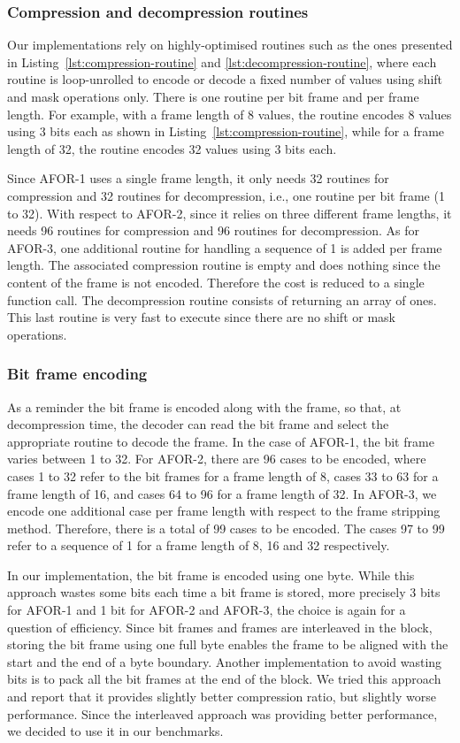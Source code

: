\subsubsection{Compression and decompression routines}

Our implementations rely on highly-optimised routines such as the ones
presented in Listing~\ref{lst:compression-routine} and
\ref{lst:decompression-routine}, where each routine is loop-unrolled to encode
or decode a fixed number of values using shift and mask operations only. There
is one routine per bit frame and per frame length. For example, with a frame
length of 8 values, the routine encodes 8 values using 3 bits each as shown in
Listing~\ref{lst:compression-routine}, while for a frame length of 32, the
routine encodes 32 values using 3 bits each.

Since AFOR-1 uses a single frame length, it only needs 32 routines for
compression and 32 routines for decompression, i.e., one routine per bit frame
(1 to 32). With respect to AFOR-2, since it relies on three different frame
lengths, it needs 96 routines for compression and 96 routines for
decompression. As for AFOR-3, one additional routine for handling a
sequence of 1 is added per frame length. The associated compression routine is
empty and does nothing since the content of the frame is not encoded.
Therefore the cost is reduced to a single function call. The decompression
routine consists of returning an array of ones. This last routine is very fast
to execute since there are no shift or mask operations.

\subsubsection{Bit frame encoding}

As a reminder the bit frame is encoded along with the frame, so that, at
decompression time, the decoder can read the bit frame and select the
appropriate routine to decode the frame. In the case of AFOR-1, the bit frame
varies between 1 to 32. For AFOR-2, there are 96 cases to be encoded, where
cases 1 to 32 refer to the bit frames for a frame length of 8, cases 33 to 63
for a frame length of 16, and cases 64 to 96 for a frame length of 32. In
AFOR-3, we encode one additional case per frame length with respect to the
frame stripping method. Therefore, there is a total of 99 cases to be encoded.
The cases 97 to 99 refer to a sequence of 1 for a frame length of 8, 16 and 32
respectively.

In our implementation, the bit frame is encoded using one byte. While this
approach wastes some bits each time a bit frame is stored, more precisely 3
bits for AFOR-1 and 1 bit for AFOR-2 and AFOR-3, the choice is again for a
question of efficiency. Since bit frames and frames are interleaved in the
block, storing the bit frame using one full byte enables the frame to be
aligned with the start and the end of a byte boundary. Another implementation
to avoid wasting bits is to pack all the bit frames at the end of the block. We
tried this approach and report that it provides slightly better compression
ratio, but slightly worse performance. Since the interleaved approach was
providing better performance, we decided to use it in our benchmarks.

